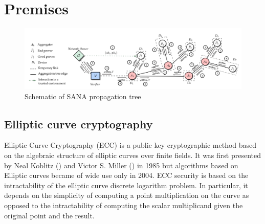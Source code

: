 \section{Premises}

\begin{figure}
    \includegraphics[width=0.9\linewidth]{Images/SANA_general.png} %
    \caption{Schematic of SANA propagation tree} %
\end{figure}

\subsection{Elliptic curve cryptography}
Elliptic Curve Cryptography (ECC) is a public key
cryptographic method based on the algebraic structure of elliptic curves over
finite fields.
It was first presented by Neal Koblitz (\cite{ecc_kob}) and Victor S. Miller (\cite{ecc_mil}) in 1985 but algorithms based on Elliptic curves became of wide use only in 2004.
ECC security is based on the intractability of the elliptic
curve discrete logarithm problem.
In particular, it depends on the simplicity of computing a point multiplication 
on the curve as opposed to the intractability of computing the scalar multiplicand
given the original point and the result.


